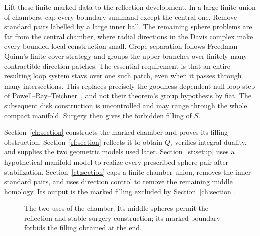 \documentclass[11pt]{article}
\theoremstyle{definition}
\theoremstyle{remark}
\begin{document}
Lift these finite marked data to the reflection development. In a large
finite union of chambers, cap every boundary summand except the central
one. Remove standard pairs labelled by a large inner ball. The remaining
sphere problems are far from the central chamber, where radial directions
in the Davis complex make every bounded local construction small.
Grope separation follows Freedman--Quinn's finite-cover strategy
\cite[Section~2.10.2]{FQ} and groups the upper branches over finitely many
contractible direction patches. The essential requirement is that an
entire resulting loop system stays over one such patch, even when it
passes through many intersections. This replaces precisely the goodness-dependent
null-loop step of Powell--Ray--Teichner~\cite{PRT}, and not their theorem's
group hypothesis by fiat. The subsequent disk construction is
uncontrolled and may range through the whole compact manifold. Surgery
then gives the forbidden filling of $S$.

Section~\ref{ch:section} constructs the marked chamber and proves its
filling obstruction. Section~\ref{rf:section} reflects it to obtain
$Q$, verifies integral duality, and supplies the two geometric models
used later. Section~\ref{st:setup} uses a hypothetical manifold model to
realize every prescribed sphere pair after stabilization.
Section~\ref{ct:section} caps a finite chamber union, removes the inner
standard pairs, and uses direction control to remove the remaining
middle homology. Its output is the marked filling excluded by
Section~\ref{ch:section}.

\begin{figure}[H]
\centering
{}
\caption{The two uses of the chamber. Its middle spheres permit the
reflection and stable-surgery construction; its marked boundary forbids
the filling obtained at the end.}
\label{fig:architecture}
\end{figure}
\end{document}
